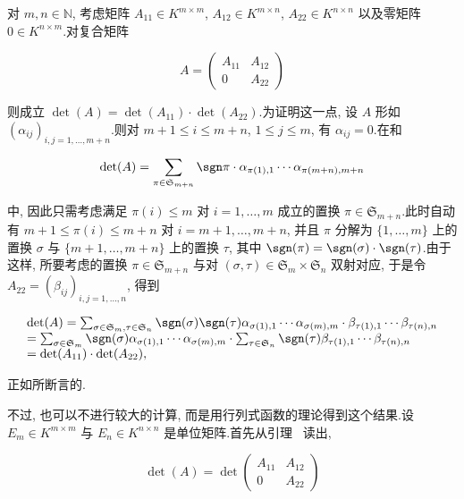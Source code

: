 \begin{bsp}\label{bsp:4.3.2}
对 $m, n \in \mathbb{N}$, 考虑矩阵 $A_{11} \in K^{m \times m}$, $A_{12} \in K^{m \times n}$, $A_{22} \in K^{n \times n}$ 以及零矩阵 $0 \in K^{n \times m}$.对复合矩阵

\[
A = \begin{pmatrix} A_{11} & A_{12} \\ 0 & A_{22} \end{pmatrix}
\]

则成立 $\det(A) = \det(A_{11}) \cdot \det(A_{22})$.为证明这一点, 设 $A$ 形如 $(\alpha_{ij})_{i, j = 1, \ldots, m + n}$.则对 $m + 1 \leq i \leq m + n$, $1 \leq j \leq m$, 有 $\alpha_{ij} = 0$.在和

\[
\det(A) = \sum_{\pi \in \mathfrak{S}_{m + n}} \sgn \pi \cdot \alpha_{\pi(1), 1} \cdots \alpha_{\pi(m + n), m + n}
\]

中, 因此只需考虑满足 $\pi(i) \leq m$ 对 $i = 1, \ldots, m$ 成立的置换 $\pi \in \mathfrak{S}_{m + n}$.此时自动有 $m + 1 \leq \pi(i) \leq m + n$ 对 $i = m + 1, \ldots, m + n$, 并且 $\pi$ 分解为 $\{1, \ldots, m\}$ 上的置换 $\sigma$ 与 $\{m + 1, \ldots, m + n\}$ 上的置换 $\tau$, 其中 $\sgn(\pi) = \sgn(\sigma) \cdot \sgn(\tau)$.由于这样, 所要考虑的置换 $\pi \in \mathfrak{S}_{m + n}$ 与对 $(\sigma, \tau) \in \mathfrak{S}_m \times \mathfrak{S}_n$ 双射对应, 于是令 $A_{22} = (\beta_{ij})_{i, j = 1, \ldots, n}$, 得到

\[
\begin{array}{l}
\det(A) = \sum_{\sigma \in \mathfrak{S}_m, \tau \in \mathfrak{S}_n} \sgn(\sigma) \sgn(\tau) \alpha_{\sigma(1), 1} \cdots \alpha_{\sigma(m), m} \cdot \beta_{\tau(1), 1} \cdots \beta_{\tau(n), n} \\
= \sum_{\sigma \in \mathfrak{S}_m} \sgn(\sigma) \alpha_{\sigma(1), 1} \cdots \alpha_{\sigma(m), m} \cdot \sum_{\tau \in \mathfrak{S}_n} \sgn(\tau) \beta_{\tau(1), 1} \cdots \beta_{\tau(n), n} \\
= \det(A_{11}) \cdot \det(A_{22}),
\end{array}
\]

正如所断言的.

不过, 也可以不进行较大的计算, 而是用行列式函数的理论得到这个结果.设 $E_m \in K^{m \times m}$ 与 $E_n \in K^{n \times n}$ 是单位矩阵.首先从引理~ 读出,

\[
\det(A) = \det \begin{pmatrix} A_{11} & A_{12} \\ 0 & A_{22} \end{pmatrix}
\]


\end{bsp}
